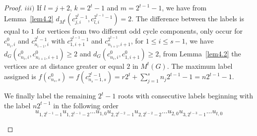 \documentclass{article}
\newtheorem{open problem} {Open Problem}
\numberwithin{lemma}{section}
\numberwithin{theorem}{section}
\numberwithin{cor}{section}
\numberwithin{prop}{section}
\numberwithin{con}{section}
\numberwithin{claim}{section}
\numberwithin{obs}{section}
\numberwithin{dnt}{section}
\begin{document}
\begin{proof}
	$iii)$ If $l=j+2$, $k=2^t-1$ and $m=2^{t-1}-1$, we have from Lemma~\ref{lem4.2} $d_{M^t}(c^{2^t-1}_{j,i},c^{2^{t-1}-1}_{l,i})=2$. The difference between the labels is equal to $1$ for vertices from two different odd cycle components, only occur for $c^0_{n_i,i}$ and $c^{2^t-1}_{n_{i-1},i}$ with $c^{2^{t-1}-1}_{1,i+1}$ and  $c^{2^{t-1}}_{n_{i+1},i+1}$, for $1\leq i \leq s-1$, we have  $d_G(c^0_{n_i,i},c^0_{n_{i+1},i+1})\geq 2$ and $d_G(c^0_{n_i,i},c^0_{1,i+1})\geq 2$,  from Lemma~\ref{lem4.2} the vertices are at distance greater or equal $2$ in $M^t(G)$.
	The maximum label assigned is $f(c^0_{n_s,s})=f(c^{2^t-1}_{n_s-1,s})=r2^t+\sum_{j=1}^{s}n_j2^{t-1}-1=n2^{t-1}-1$.

	\par
	We finally label the remaining $2^t-1$ roots with consecutive labels beginning with the label $n2^{t-1}$ in the following order $$u_{1,2^{t-1}-1}u_{1,2^{t-1}-2}\ldots u_{1,0}u_{2,2^{t-2}-1}u_{2,2^{t-2}-2}\ldots u_{2,0}u_{3,2^{t-3}-1}\ldots u_{t,0} $$		
	\begin{figure}[h]
		
		\centering
		

\end{figure}
\end{proof}
\end{document}
